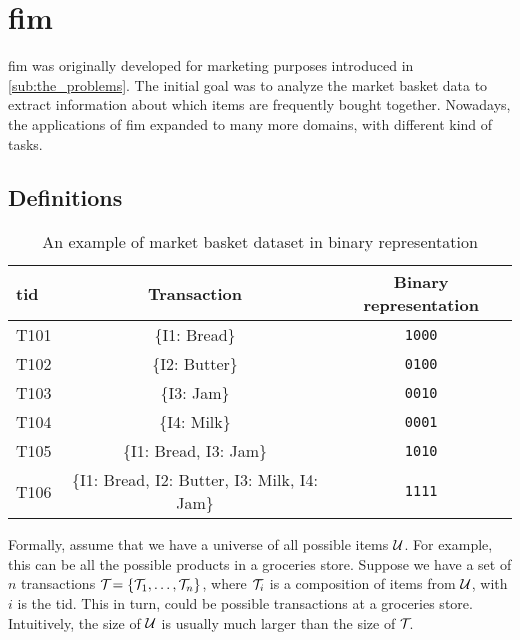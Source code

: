 \section{\Acl{fim}}
\label{sec:fim}
\Acl{fim} was originally developed for marketing purposes introduced in \autoref{sub:the_problems}.
The initial goal was to analyze the market basket data to extract information about which items are frequently bought together.
Nowadays, the applications of \acl{fim} expanded to many more domains, with different kind of tasks.

\subsection{Definitions}
\label{sub:association_rule_mining}
\begin{table}[tb]
    \centering
    \begin{tabular}{|l|c|c|}
        \hline
        \textbf{tid} & \textbf{Transaction}                           & \textbf{Binary representation} \\ \hline
        T101         & \{I1: Bread\}                                  & \texttt{1000}                  \\ \hline
        T102         & \{I2: Butter\}                                 & \texttt{0100}                  \\ \hline
        T103         & \{I3: Jam\}                                    & \texttt{0010}                  \\ \hline
        T104         & \{I4: Milk\}                                   & \texttt{0001}                  \\ \hline
        T105         & \{I1: Bread, I3: Jam\}                         & \texttt{1010}                  \\ \hline
        T106         & \{I1: Bread, I2: Butter, I3: Milk, I4: Jam\}   & \texttt{1111}                  \\ \hline
    \end{tabular}%
    \caption{An example of market basket dataset in binary representation}
    \label{tab:binary-prepresentation}
\end{table}
Formally, assume that we have a universe of all possible items $\mathcal{U}$.
For example, this can be all the possible products in a groceries store.
Suppose we have a set of $\mathit{n}$ transactions $\mathcal{T}_{} = \{\mathcal{T}_{1}, \dots, \mathcal{T}_{n}\}{}$, where $\mathcal{T}_{i}$ is a composition of items from $\mathcal{U}$, with $i$ is the \ac{tid}.
This in turn, could be possible transactions at a groceries store.
Intuitively, the size of $\mathcal{U}$ is usually much larger than the size of $\mathcal{T}_{}$.

